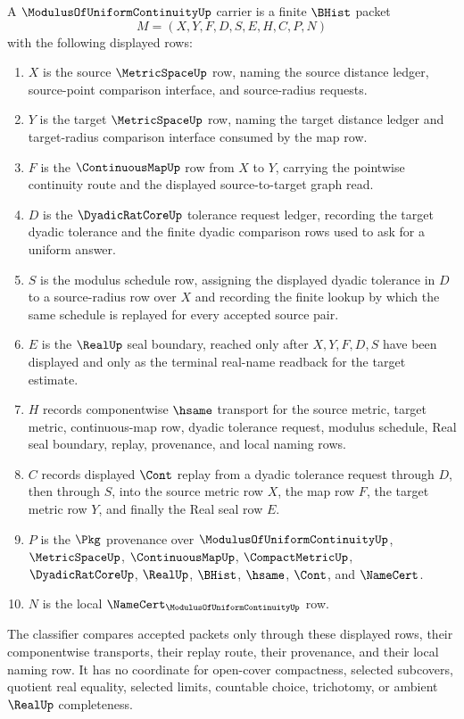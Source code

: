 \begin{definition}
\label{def:modulus-of-uniform-continuity-carrier}
A $\ModulusOfUniformContinuityUp$ carrier is a finite $\BHist$ packet
$$
M=(X,Y,F,D,S,E,H,C,P,N)
$$
with the following displayed rows:
\begin{enumerate}
\item $X$ is the source $\MetricSpaceUp$ row, naming the source distance ledger, source-point comparison interface, and source-radius requests.
\item $Y$ is the target $\MetricSpaceUp$ row, naming the target distance ledger and target-radius comparison interface consumed by the map row.
\item $F$ is the $\ContinuousMapUp$ row from $X$ to $Y$, carrying the pointwise continuity route and the displayed source-to-target graph read.
\item $D$ is the $\DyadicRatCoreUp$ tolerance request ledger, recording the target dyadic tolerance and the finite dyadic comparison rows used to ask for a uniform answer.
\item $S$ is the modulus schedule row, assigning the displayed dyadic tolerance in $D$ to a source-radius row over $X$ and recording the finite lookup by which the same schedule is replayed for every accepted source pair.
\item $E$ is the $\RealUp$ seal boundary, reached only after $X,Y,F,D,S$ have been displayed and only as the terminal real-name readback for the target estimate.
\item $H$ records componentwise $\hsame$ transport for the source metric, target metric, continuous-map row, dyadic tolerance request, modulus schedule, Real seal boundary, replay, provenance, and local naming rows.
\item $C$ records displayed $\Cont$ replay from a dyadic tolerance request through $D$, then through $S$, into the source metric row $X$, the map row $F$, the target metric row $Y$, and finally the Real seal row $E$.
\item $P$ is the $\Pkg$ provenance over $\ModulusOfUniformContinuityUp$, $\MetricSpaceUp$, $\ContinuousMapUp$, $\CompactMetricUp$, $\DyadicRatCoreUp$, $\RealUp$, $\BHist$, $\hsame$, $\Cont$, and $\NameCert$.
\item $N$ is the local $\NameCert_{\ModulusOfUniformContinuityUp}$ row.
\end{enumerate}
The classifier compares accepted packets only through these displayed rows, their componentwise transports, their replay route, their provenance, and their local naming row. It has no coordinate for open-cover compactness, selected subcovers, quotient real equality, selected limits, countable choice, trichotomy, or ambient $\RealUp$ completeness.
\end{definition}

